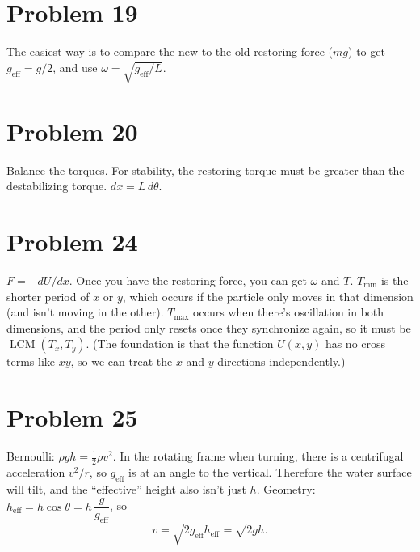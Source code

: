 \documentclass[11pt]{article}
\begin{document}
\section*{Problem 19}
The easiest way is to compare the new to the old restoring force ($mg$) to get $g_{\text{eff}}=g/2$, and use $\omega=\sqrt{g_{\text{eff}}/L}$.

\section*{Problem 20}
Balance the torques. For stability, the restoring torque must be greater than the destabilizing torque.
$dx=L\,d\theta$.

\section*{Problem 24}
$F=-dU/dx$. Once you have the restoring force, you can get $\omega$ and $T$.
$T_{\min}$ is the shorter period of $x$ or $y$, which occurs if the particle only moves in that dimension (and isn't moving in the other).
$T_{\max}$ occurs when there's oscillation in both dimensions, and the period only resets once they synchronize again, so it must be $\operatorname{LCM}(T_x,T_y)$.
(The foundation is that the function $U(x,y)$ has no cross terms like $xy$, so we can treat the $x$ and $y$ directions independently.)

\section*{Problem 25}
Bernoulli: $\rho gh=\tfrac12\rho v^2$.
In the rotating frame when turning, there is a centrifugal acceleration $v^2/r$, so $g_{\text{eff}}$ is at an angle to the vertical. Therefore the water surface will tilt, and the ``effective'' height also isn't just $h$.
Geometry: $h_{\text{eff}}=h\cos\theta=h\,\dfrac{g}{g_{\text{eff}}}$, so
\[
v=\sqrt{2g_{\text{eff}}h_{\text{eff}}}=\sqrt{2gh}.
\]

\begin{center}
\end{center}
\end{document}
